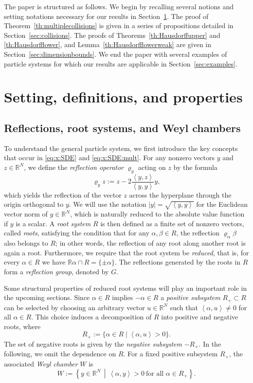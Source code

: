 \documentclass{article}
\numberwithin{equation}{section}
\newcommand{\R}{\mathbb{R}}
\newcommand{\inner}[2]{\left<#1,#2\right>}
\newcommand{\C}{W}
\newcommand{\yy}{\left<y,y\right>}
\newcommand{\yz}{\left<y,z\right>}
\newcommand{\reflect}[1]{\varrho_{#1}}
\theoremstyle{plain}
\begin{document}
The paper is structured as follows.
We begin by recalling several notions and setting notations necessary for our results in Section~\ref{sec:prelim}.
The proof of Theorem~\ref{th:multiplecollisions} is given in a series of propositions detailed in Section~\ref{sec:collisions}.
The proofs of Theorems~\ref{th:Hausdorffupper} and \ref{th:Hausdorfflower}, and Lemma~\ref{th:Hausdorfflowerweak} are given in Section~\ref{sec:dimensionbounds}.
We end the paper with several examples of particle systems for which our results are applicable in Section~\ref{sec:examples}.

\section{Setting, definitions, and properties}\label{sec:prelim}

\subsection{Reflections, root systems, and Weyl chambers}
\label{sec:roots}
To understand the general particle system, we first introduce the key concepts that occur in \eqref{eq:x:SDE} and \eqref{eq:x:SDE:mult}. For any nonzero vectors $y$ and $z\in\R^N$, we define the \emph{reflection operator} $\reflect{y}$ acting on $z$ by the formula
\[
\reflect{y} z := z - 2\frac{\yz}{\yy}y,
\]
which yields the reflection of the vector $z$ across the hyperplane through the origin orthogonal to $y$. 
We will use the notation $|y|=\sqrt{\inner{y}{y}}$ for the Euclidean vector norm of $y\in\R^N$, which is naturally reduced to the absolute value function if $y$ is a scalar. A \emph{root system} $R$ is then defined as a finite set of nonzero vectors, called \emph{roots}, satisfying the condition that for any $\alpha, \beta \in R$, the reflection $\reflect\alpha \beta$ also belongs to $R$; in other words, the reflection of any root along another root is again a root. Furthermore, we require that the root system be \emph{reduced}, that is, for every $\alpha\in R$ we have $\R \alpha\cap R =\{\pm\alpha\}$. The reflections generated by the roots in \( R \) form a \textit{reflection group}, denoted by \( G \).

Some structural properties of reduced root systems will play an important role in the upcoming sections. Since $\alpha\in R$ implies $-\alpha \in R$ a \emph{positive subsystem} \( R_+ \subset R \) can be selected by choosing an arbitrary vector \( u \in \R^N \) such that \( \inner{\alpha}{u} \neq 0 \) for all \( \alpha \in R \). This choice induces a decomposition of \( R \) into positive and negative roots, where
\[
R_+ := \{ \alpha \in R \mid \inner{\alpha}{u} > 0 \}.
\]
The set of negative roots is given by the \emph{negative subsystem} \( -R_+ \). In the following, we omit the dependence on \( R \). For a fixed positive subsystem \( R_+ \), the associated \emph{Weyl chamber} \( \C\) is
\[
\C := \left\{ y \in \R^N \,\middle|\, \inner{\alpha}{y} > 0 \ \text{for all } \alpha \in R_+ \right\}.
\]
\end{document}
